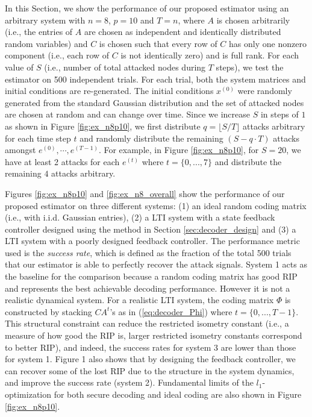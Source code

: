\documentclass[../../thesis.tex]{subfiles}
\begin{document}
In this Section, we show the performance of our proposed estimator using an arbitrary system with $n=8$, $p=10$ and $T=n$, where $A$ is chosen arbitrarily (i.e., the entries of $A$ are chosen as independent and identically distributed random variables) and $C$ is chosen such that every row of $C$ has only one nonzero component (i.e., each row of $C$ is not identically zero) and is full rank. 
For each value of $S$ (i.e., number of total attacked nodes during $T$ steps), we test the estimator on 500 independent trials. For each trial, both the system matrices and initial conditions are re-generated. The initial conditions $x^{(0)}$ were randomly generated from the standard Gaussian distribution and the set of attacked nodes are chosen at random and can change over time. Since we increase $S$ in steps of $1$ as shown in Figure \ref{fig:ex_n8p10}, %
we first distribute $q= \lfloor S/T \rfloor$ attacks arbitrary for each time step $t$ and randomly distribute the remaining $(S-q\cdot T)$ attacks amongst $e^{(0)},\cdots, e^{(T-1)}$. For example, in Figure \ref{fig:ex_n8p10}, for $S=20$, we have at least 2 attacks for each $e^{(t)}$ where $t=\{0,...,7\}$ and distribute the remaining $4$ attacks arbitrary. 

Figures \ref{fig:ex_n8p10} and \ref{fig:ex_n8_overall} show the performance of our proposed estimator on three different systems: (1) an ideal random coding matrix (i.e., with i.i.d. Gaussian entries), (2) a LTI system with a state feedback controller designed using the method in Section \ref{sec:decoder_design} and (3) a LTI system with a poorly designed feedback controller. 
The performance metric used is the \textit{success rate}, which is defined as the fraction of the total 500 trials that our estimator is able to perfectly recover the attack signals.
System 1 acts as the baseline for the comparison because a random coding matrix has good RIP and represents the best achievable decoding performance. However it is not a realistic dynamical system. For a realistic LTI system, the coding matrix $\Phi$ is constructed by stacking $CA^{t}$'s as in (\ref{eq:decoder_Phi}) where $t=\{ 0, ..., T-1\}$. This structural constraint can reduce the restricted isometry constant (i.e., a measure of how good the RIP is, larger restricted isometry constants correspond to better RIP), and indeed, the success rates for system 3 are lower than those for system 1. Figure 1 also shows that by designing the feedback controller, we can recover some of the lost RIP due to the structure in the system dynamics, and improve the success rate (system 2).
Fundamental limits of the $l_1$-optimization for both secure decoding and ideal coding are also shown in Figure \ref{fig:ex_n8p10}. 
\end{document}

